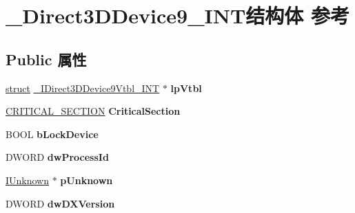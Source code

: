 \hypertarget{struct___direct3_d_device9___i_n_t}{}\section{\+\_\+\+Direct3\+D\+Device9\+\_\+\+I\+N\+T结构体 参考}
\label{struct___direct3_d_device9___i_n_t}
\subsection*{Public 属性}
\begin{DoxyCompactItemize}
\item 
\mbox{\label{struct___direct3_d_device9___i_n_t_af3644879f0957ff04040f152e9a48bc7}} 
\hyperlink{interfacestruct}{struct} \hyperlink{struct___i_direct3_d_device9_vtbl___i_n_t}{\+\_\+\+I\+Direct3\+D\+Device9\+Vtbl\+\_\+\+I\+NT} $\ast$ {\bfseries lp\+Vtbl}
\item 
\mbox{\label{struct___direct3_d_device9___i_n_t_aad10ccec541cc5fcaafb60f15aa2ec81}} 
\hyperlink{struct___c_r_i_t_i_c_a_l___s_e_c_t_i_o_n}{C\+R\+I\+T\+I\+C\+A\+L\+\_\+\+S\+E\+C\+T\+I\+ON} {\bfseries Critical\+Section}
\item 
\mbox{\label{struct___direct3_d_device9___i_n_t_ac41d31ed2be778e47ba4217f0ad7dcde}} 
B\+O\+OL {\bfseries b\+Lock\+Device}
\item 
\mbox{\label{struct___direct3_d_device9___i_n_t_aea6f55505d88b5a36f490cae7dcb6400}} 
D\+W\+O\+RD {\bfseries dw\+Process\+Id}
\item 
\mbox{\label{struct___direct3_d_device9___i_n_t_a4d1104c6823ce03e452a917ad5adc46d}} 
\hyperlink{interface_i_unknown}{I\+Unknown} $\ast$ {\bfseries p\+Unknown}
\item 
\mbox{\label{struct___direct3_d_device9___i_n_t_ac357fefa4bfc0fca0b85c094de73eec8}} 
D\+W\+O\+RD {\bfseries dw\+D\+X\+Version}
\item 
\mbox{\label{struct___direct3_d_device9___i_n_t_a7075022a3a453b9286e855a7cf8dc308}} 

\end{DoxyCompactItemize}
